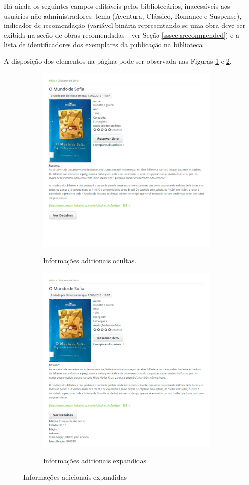 \documentclass[a4paper]{article}
\begin{document}
Há ainda os seguintes campos editáveis pelos bibliotecários, inacessíveis aos usuários não administradores: tema (Aventura, Clássico, Romance e Suspense), indicador de recomendação (variável binária representando se uma obra deve ser exibida na seção de obras recomendadas - ver Seção \ref{sssec:srecommended}) e a lista de identificadores dos exemplares da publicação na biblioteca

A disposição dos elementos na página pode ser observada nas Figuras \ref{colapsed} e \ref{expanded}.

\begin{figure}
\caption{Página de uma publicação}
\begin{subfigure}{.5\textwidth}
  \caption{Informações adicionais ocultas.}
  \includegraphics[width=90mm]{img/publication-colapsed.png}
  \label{colapsed}
\end{subfigure}%
\begin{subfigure}{.4\textwidth}
  \caption{Informações adicionais expandidas}
  \includegraphics[width=90mm]{img/publication-expanded.png}
  \label{expanded}
\end{subfigure}
\label{fig:publication}
\end{figure}
\end{document}

